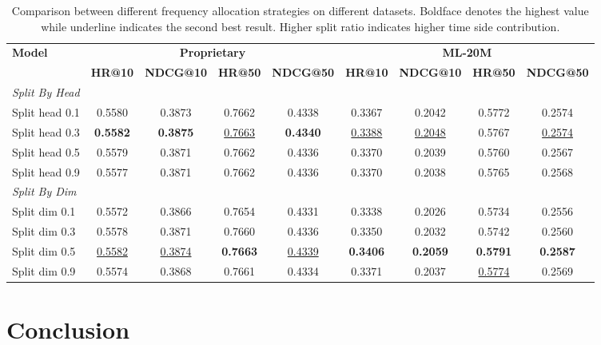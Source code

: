 \documentclass[sigconf]{acmart}
\begin{document}
\begin{table}[htbp]
\centering
\caption{Comparison between different frequency allocation strategies on different datasets. Boldface denotes the highest value while underline indicates the second best result. Higher split ratio indicates higher time side contribution.}
\renewcommand{\arraystretch}{1.2}
\label{tab:rope_variants_adjusted}
\begin{tabular}{l|cccc|cccc}
\hline
\multirow{2}{*}{\textbf{Model}} & \multicolumn{4}{c|}{\textbf{Proprietary}} & \multicolumn{4}{c}{\textbf{ML-20M}} \\
\cline{2-9}
& \textbf{HR@10} & \textbf{NDCG@10} & \textbf{HR@50} & \textbf{NDCG@50} & \textbf{HR@10} & \textbf{NDCG@10} & \textbf{HR@50} & \textbf{NDCG@50} \\
\hline

\textit{Split By Head} & & & & & & & & \\
Split head 0.1 & 0.5580 & 0.3873 & 0.7662 & 0.4338 & 0.3367 & 0.2042 & 0.5772 & 0.2574 \\
Split head 0.3 & \textbf{0.5582} & \textbf{0.3875} & \underline{0.7663} & \textbf{0.4340} & \underline{0.3388} & \underline{0.2048} & 0.5767 & \underline{0.2574} \\
Split head 0.5 & 0.5579 & 0.3871 & 0.7662 & 0.4336 & 0.3370 & 0.2039 & 0.5760 & 0.2567 \\
Split head 0.9 & 0.5577 & 0.3871 & 0.7662 & 0.4336 & 0.3370 & 0.2038 & 0.5765 & 0.2568 \\
\hline

\textit{Split By Dim} & & & & & & & & \\
Split dim 0.1 & 0.5572 & 0.3866 & 0.7654 & 0.4331 & 0.3338 & 0.2026 & 0.5734 & 0.2556 \\
Split dim 0.3 & 0.5578 & 0.3871 & 0.7660 & 0.4336 & 0.3350 & 0.2032 & 0.5742 & 0.2560 \\
Split dim 0.5 & \underline{0.5582} & \underline{0.3874} & \textbf{0.7663} & \underline{0.4339} & \textbf{0.3406} & \textbf{0.2059} & \textbf{0.5791} & \textbf{0.2587} \\
Split dim 0.9 & 0.5574 & 0.3868 & 0.7661 & 0.4334 & 0.3371 & 0.2037 & \underline{0.5774} & 0.2569 \\
\hline
\end{tabular}
\end{table}



\section{Conclusion}
\end{document}

